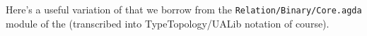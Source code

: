 Here's a useful variation of  that we borrow from the \texttt{Relation/Binary/Core.agda} module of the \agdastdlib (transcribed into TypeTopology/UALib notation of course).
\ccpad
\begin{code}%
\>[0]\AgdaSpace{}%
\AgdaSymbol{:}%
\>[101I]\AgdaSymbol{\{}\AgdaSpace{}%
\AgdaSymbol{:}\AgdaSpace{}%
\AgdaSpace{}%
\AgdaSymbol{\}\{}\AgdaSpace{}%
\AgdaSymbol{:}\AgdaSpace{}%
\AgdaSpace{}%
\AgdaSpace{}%
\AgdaSpace{}%
\AgdaSymbol{\}\{}\AgdaSpace{}%
\AgdaSpace{}%
\AgdaSymbol{:}\AgdaSpace{}%
\AgdaSpace{}%
\AgdaSymbol{\}}\AgdaSpace{}%
\AgdaSpace{}%
\AgdaSpace{}%
\AgdaSpace{}%
\AgdaSpace{}%
\AgdaSpace{}%
\AgdaSymbol{(}\AgdaSpace{}%
\AgdaSymbol{:}\AgdaSpace{}%
\AgdaSymbol{)}\AgdaSpace{}%
\AgdaSpace{}%
\AgdaSpace{}%
\AgdaSpace{}%
\AgdaSpace{}%
\AgdaSpace{}%
\<%
\\
%
\>[0]\AgdaSpace{}%
\AgdaSpace{}%
\AgdaSymbol{\AgdaUnderscore{}}\AgdaSpace{}%
\AgdaSymbol{=}\AgdaSpace{}%
\<%
\end{code}


